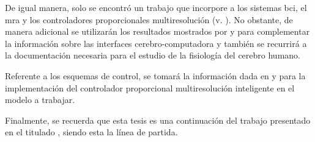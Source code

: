     De igual manera, solo se encontró un trabajo que incorpore a los sistemas \acrshort{bci}, el \acrlong{mra} y los controladores proporcionales multiresolución (v. \cite{GarciaBlancas2016}). No obstante, de manera adicional se utilizarán los resultados mostrados por \cite{MamaniMusaja2018,HernandezPerez2018,OlivaresCarillo2017} y \cite{Goeksu2018} para complementar la información sobre las interfaces cerebro-computadora y también se recurrirá a la documentación necesaria para el estudio de la fisiología del cerebro humano.
    
    Referente a los esquemas de control, se tomará la información dada en \cite{VegaNavarrete2013,CarrilloSantos2012} y \cite{VillarealGrajales2017} para la implementación del controlador proporcional multiresolución inteligente en el modelo a trabajar.
    
    Finalmente, se recuerda que esta tesis es una continuación del trabajo presentado en el \citeyear{GarciaCastro2020} titulado  \cite{GarciaCastro2020}, siendo esta la línea de partida.